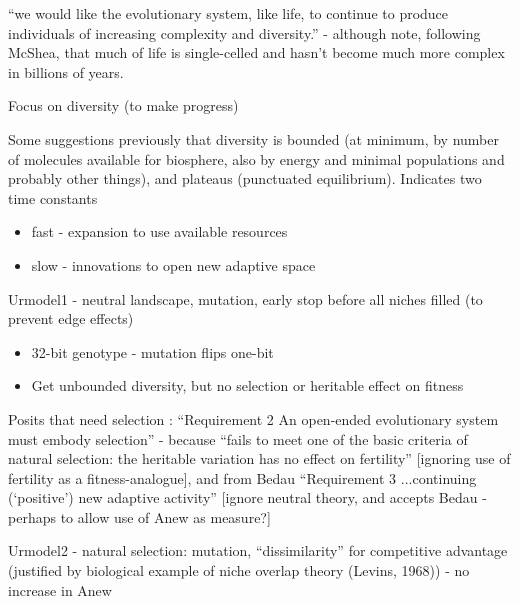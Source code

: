 \autocite{Maley1999}

``we would like the evolutionary system, like life, to continue to
produce individuals of increasing complexity and diversity.'' -
although note, following McShea, that much of life is single-celled
and hasn't become much more complex in billions of years.


Focus on diversity (to make progress)


Some suggestions previously that diversity is bounded (at minimum, by
number of molecules available for biosphere, also by energy and
minimal populations and probably other things), and plateaus
(punctuated equilibrium). Indicates two time constants


\begin{itemize}
	\item
	
	fast - expansion to use available resources
	
	\item
	
	slow - innovations to open new adaptive space
	
\end{itemize}


Urmodel1 - neutral landscape, mutation, early stop before all niches
filled (to prevent edge effects)

\begin{itemize}
	\item
	
	32-bit genotype - mutation flips one-bit
	
	\item
	
	Get unbounded diversity, but no selection or heritable effect on
	fitness
	
\end{itemize}

Posits that need selection : ``Requirement 2 An open-ended
evolutionary system must embody selection'' - because ``fails to meet
one of the basic criteria of natural selection: the heritable
variation has no effect on fertility'' {[}ignoring use of fertility as
a fitness-analogue{]}, and from Bedau ``Requirement 3 ...continuing
(`positive') new adaptive activity'' {[}ignore neutral theory, and
accepts Bedau - perhaps to allow use of Anew as measure?{]}


Urmodel2 - natural selection: mutation, ``dissimilarity'' for
competitive advantage (justified by biological example of niche
overlap theory (Levins, 1968)) - no increase in Anew


